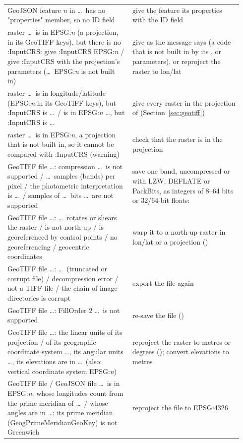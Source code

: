 \begin{longtable}{P{0.5\linewidth}P{0.44\linewidth}}
GeoJSON feature \emph{n} in \dots\ has no "properties" member, so no ID field & give the feature its properties with the ID field\\
raster \dots\ is in EPSG:\emph{n} (a projection, in its GeoTIFF keys), but there is no :InputCRS: give :InputCRS EPSG:\emph{n} / give :InputCRS with the projection's parameters (\dots\ EPSG:\emph{n} is not built in) & give  as the message says (a code that is not built in by its ,  or  parameters), or reproject the raster to lon/lat\\
raster \dots\ is in longitude/latitude (EPSG:\emph{n} in its GeoTIFF keys), but :InputCRS is \dots\ / is in EPSG:\emph{n} \dots, but :InputCRS is \dots & give every raster in the projection of  (Section~\ref{sec:geotiff})\\
raster \dots\ is in EPSG:\emph{n}, a projection that is not built in, so it cannot be compared with :InputCRS (warning) & check that the raster is in the  projection\\
GeoTIFF file \dots: compression \dots\ is not supported / \dots\ samples (bands) per pixel / the photometric interpretation is \dots\ / samples of \dots\ bits \dots\ are not supported & save one band, uncompressed or with LZW, DEFLATE or PackBits, as integers of 8--64 bits or 32/64-bit floats: \\
GeoTIFF file \dots: \dots\ rotates or shears the raster / is not north-up / is georeferenced by control points / no georeferencing / geocentric coordinates & warp it to a north-up raster in lon/lat or a projection ()\\
GeoTIFF file \dots: \dots\ (truncated or corrupt file) / decompression error / not a TIFF file / the chain of image directories is corrupt & export the file again\\
GeoTIFF file \dots: FillOrder 2 \dots\ is not supported & re-save the file ()\\
GeoTIFF file \dots: the linear units of its projection / of its geographic coordinate system \dots, its angular units \dots, its elevations are in \dots\ (also: vertical coordinate system EPSG:\emph{n}) & reproject the raster to metres or degrees (); convert elevations to metres\\
GeoTIFF file / GeoJSON file \dots\ is in EPSG:\emph{n}, whose longitudes count from the prime meridian of \dots\ / whose angles are in \dots; its prime meridian (GeogPrimeMeridianGeoKey) is not Greenwich & reproject the file to EPSG:4326\\

\end{longtable}
